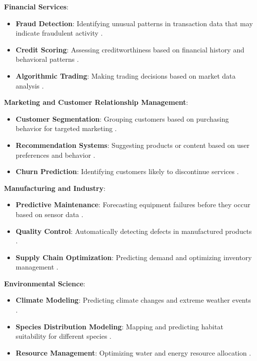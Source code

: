 \textbf{Financial Services}:
\begin{itemize}
  \item \textbf{Fraud Detection}: Identifying unusual patterns in transaction data that may indicate fraudulent activity \cite{bhattacharyya2011data}.
  \item \textbf{Credit Scoring}: Assessing creditworthiness based on financial history and behavioral patterns \cite{khandani2010consumer}.
  \item \textbf{Algorithmic Trading}: Making trading decisions based on market data analysis \cite{treleaven2013algorithmic}.
\end{itemize}

\textbf{Marketing and Customer Relationship Management}:
\begin{itemize}
  \item \textbf{Customer Segmentation}: Grouping customers based on purchasing behavior for targeted marketing \cite{tsai2009customer}.
  \item \textbf{Recommendation Systems}: Suggesting products or content based on user preferences and behavior \cite{ricci2011introduction}.
  \item \textbf{Churn Prediction}: Identifying customers likely to discontinue services \cite{verbeke2012building}.
\end{itemize}

\textbf{Manufacturing and Industry}:
\begin{itemize}
  \item \textbf{Predictive Maintenance}: Forecasting equipment failures before they occur based on sensor data \cite{mobley2002introduction}.
  \item \textbf{Quality Control}: Automatically detecting defects in manufactured products \cite{kumar2008computer}.
  \item \textbf{Supply Chain Optimization}: Predicting demand and optimizing inventory management \cite{carbonneau2008application}.
\end{itemize}

\textbf{Environmental Science}:
\begin{itemize}
  \item \textbf{Climate Modeling}: Predicting climate changes and extreme weather events \cite{reichstein2019deep}.
  \item \textbf{Species Distribution Modeling}: Mapping and predicting habitat suitability for different species \cite{elith2006novel}.
  \item \textbf{Resource Management}: Optimizing water and energy resource allocation \cite{wu2014real}.
\end{itemize}


